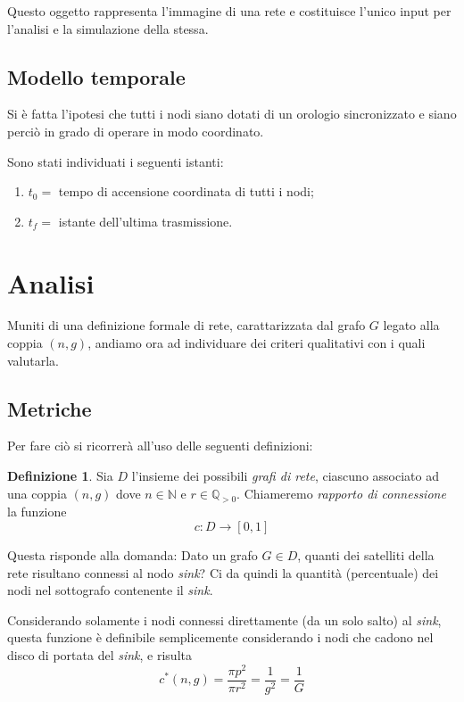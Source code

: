 \documentclass[a4paper,12pt]{article}
\theoremstyle{definition}
\newtheorem{definition}{Definizione}
\begin{document}
Questo oggetto rappresenta l'immagine di una rete e costituisce l'unico input per l'analisi e la simulazione della stessa.

\subsection{Modello temporale}

Si è fatta l'ipotesi che tutti i nodi siano dotati di un orologio sincronizzato e siano perciò in grado di operare in modo coordinato.

Sono stati individuati i seguenti istanti:

\begin{enumerate}
\item $t_0 =$ tempo di accensione coordinata di tutti i nodi;
\item $t_f =$ istante dell'ultima trasmissione.
\end{enumerate}

\section{Analisi}

Muniti di una definizione formale di rete, carattarizzata dal grafo $G$ legato alla coppia $(n, g)$, andiamo ora ad individuare dei criteri qualitativi con i quali valutarla.

\subsection{Metriche}

Per fare ciò si ricorrerà all'uso delle seguenti definizioni:

\begin{definition}
Sia $D$ l'insieme dei possibili \emph{grafi di rete}, ciascuno associato ad una coppia $(n, g)$ dove $n \in \mathbb{N}$ e $r \in \mathbb{Q}_{>0}$. Chiameremo \emph{rapporto di connessione} la funzione
$$ c \colon D \to [0, 1] $$
\end{definition}

Questa risponde alla domanda: Dato un grafo $G \in D$, quanti dei satelliti della rete risultano connessi al nodo \emph{sink}? Ci da quindi la quantità (percentuale) dei nodi nel sottografo contenente il \emph{sink}.

Considerando solamente i nodi connessi direttamente (da un solo salto) al \emph{sink}, questa funzione è definibile semplicemente considerando i nodi che cadono nel disco di portata del \emph{sink}, e risulta
\begin{equation}
c^{*}(n, g) = \frac{\pi p^2}{\pi r^2} = \frac{1}{g^2} = \frac{1}{G}
\end{equation}
\end{document}
